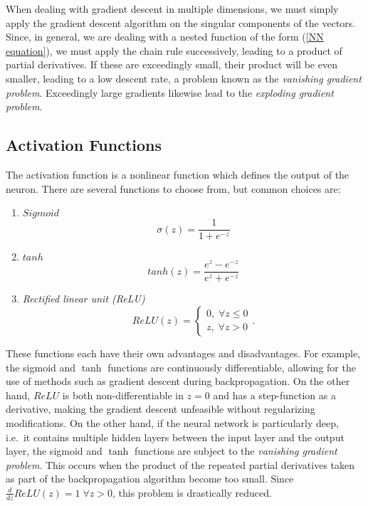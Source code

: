 \documentclass[10pt,a4paper]{book}
\begin{document}
When dealing with gradient descent in multiple dimensions, we must simply apply the gradient descent algorithm on the singular components of the vectors. Since, in general, we are dealing with a nested function of the form (\ref{NN equation}), we must apply the chain rule successively, leading to a product of partial derivatives. If these are exceedingly small, their product will be even smaller, leading to a low descent rate, a problem known as the \emph{vanishing gradient problem}. Exceedingly large gradients likewise lead to the \emph{exploding gradient problem}. 

\subsection{Activation Functions}
The activation function is a nonlinear function which defines the output of the neuron. There are several functions to choose from, but common choices are:
\begin{enumerate}
\item $Sigmoid$
\begin{equation*}
\sigma(z) = \frac{1}{1 + e^{-z}}
\end{equation*}
\item $tanh$
\begin{equation*}
tanh(z) = \frac{e^z - e^{-z}}{e^z + e^{-z}}
\end{equation*}
\item \emph{Rectified linear unit (ReLU)}
\begin{equation*}
ReLU(z) = \begin{cases}
0, \; \forall z \leq 0 \\
z, \; \forall z > 0
\end{cases}.
\end{equation*}
\end{enumerate} 
These functions each have their own advantages and disadvantages. For example, the sigmoid and $\tanh$ functions are continuously differentiable, allowing for the use of methods such as gradient descent during backpropagation. On the other hand, $ReLU$ is both non-differentiable in $z = 0$ and has a step-function as a derivative, making the gradient descent unfeasible without regularizing modifications. On the other hand, if the neural network is particularly deep, i.e.\ it contains multiple hidden layers between the input layer and the output layer, the sigmoid and $\tanh$ functions are subject to the \emph{vanishing gradient problem}. This occurs when the product of the repeated partial derivatives taken as part of the backpropagation algorithm become too small. Since $\frac{d}{dz}ReLU(z) = 1 \; \forall z > 0$, this problem is drastically reduced.
\end{document}
